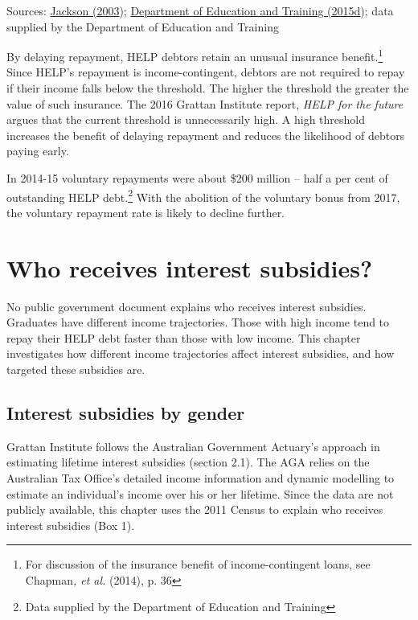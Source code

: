 \documentclass[]{book}
\begin{document}
Sources: \protect\hyperlink{_ENREF_50}{Jackson (2003}); \protect\hyperlink{_ENREF_27}{Department of Education and Training (2015d}); data supplied by the Department of Education and Training

By delaying repayment, HELP debtors retain an unusual insurance benefit.\footnote{For discussion of the insurance benefit of income-contingent loans, see Chapman\emph{, et al.} (2014), p. 36} Since HELP's repayment is income-contingent, debtors are not required to repay if their income falls below the threshold. The higher the threshold the greater the value of such insurance. The 2016 Grattan Institute report, \emph{HELP for the future} argues that the current threshold is unnecessarily high. A high threshold increases the benefit of delaying repayment and reduces the likelihood of debtors paying early.

In 2014-15 voluntary repayments were about \$200 million -- half a per cent of outstanding HELP debt.\footnote{Data supplied by the Department of Education and Training} With the abolition of the voluntary bonus from 2017, the voluntary repayment rate is likely to decline further.

\chapter{\texorpdfstring{\protect\hypertarget{_Ref333320008}{}{\protect\hypertarget{_Toc341784482}{}{}}Who receives interest subsidies?}{Who receives interest subsidies?}}\label{who-receives-interest-subsidies}

No public government document explains who receives interest subsidies. Graduates have different income trajectories. Those with high income tend to repay their HELP debt faster than those with low income. This chapter investigates how different income trajectories affect interest subsidies, and how targeted these subsidies are.

\section{Interest subsidies by gender}\label{interest-subsidies-by-gender}

Grattan Institute follows the Australian Government Actuary's approach in estimating lifetime interest subsidies (section 2.1). The AGA relies on the Australian Tax Office's detailed income information and dynamic modelling to estimate an individual's income over his or her lifetime. Since the data are not publicly available, this chapter uses the 2011 Census to explain who receives interest subsidies (Box 1).
\end{document}
